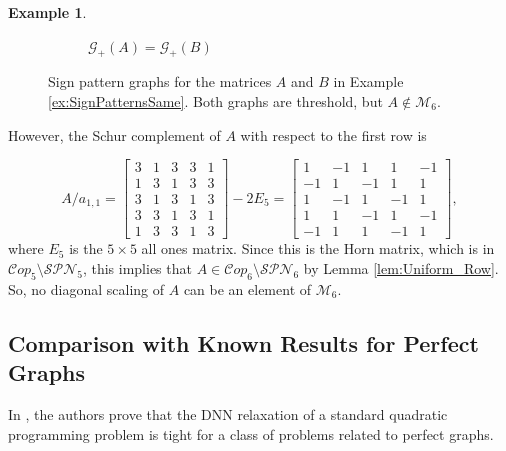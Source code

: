 \documentclass{amsart}
\newcommand{\cM}{\mathcal{M}}
\newcommand{\cG}{\mathcal{G}}
\newcommand{\Cop}{\mathcal{C}op}
\newcommand{\SPN}{\mathcal{SPN}}
\theoremstyle{definition}
\newtheorem{example}[theorem]{Example}
\begin{document}
\begin{example}
\begin{figure}
\begin{subfigure}[b]{0.45\textwidth}
\caption{$\cG_+(A) = \cG_+(B)$}
\end{subfigure}
\caption{Sign pattern graphs for the matrices $A$ and $B$ in Example \ref{ex:SignPatternsSame}. Both graphs are threshold, but $A \not \in \cM_6$.}\label{fig:SignPatternEx}
\end{figure}

However, the Schur complement of $A$ with respect to the first row is 

\[A/a_{1,1} = \begin{bmatrix} 3 & 1 & 3 & 3 & 1\\
 1 & 3 & 1 & 3 & 3\\
  3 & 1 & 3 & 1 & 3\\
  3 & 3 & 1 & 3 & 1\\
  1 & 3 & 3 & 1& 3\end{bmatrix} - 2E_5 = \begin{bmatrix}1 & -1 & 1 & 1 & -1 \\ -1 & 1 & -1 & 1 & 1\\ 1 & -1 & 1 & -1 & 1\\ 1 & 1 & -1 & 1 & -1\\ -1 & 1 & 1 & -1 & 1 \end{bmatrix},\]
 where $E_5$ is the $5\times 5$ all ones matrix. Since this is the Horn matrix, which is in $\Cop_5 \setminus \SPN_5$, this implies that $A \in \Cop_6 \setminus \SPN_6$ by Lemma \ref{lem:Uniform_Row}. So, no diagonal scaling of $A$ can be an element of $\mathcal{M}_6$. 
\end{example}

\subsection{Comparison with Known Results for Perfect Graphs}

In \cite{gokmen2022standard}, the authors prove that the DNN relaxation of a standard quadratic programming problem is tight for a class of problems related to perfect graphs. 
\end{document}
